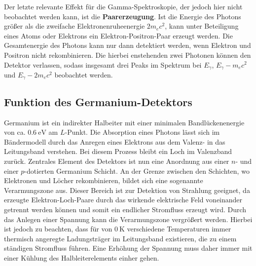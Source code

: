 Der letzte relevante Effekt für die Gamma-Spektroskopie, der jedoch hier nicht beobachtet werden kann, ist die
\textbf{Paarerzeugung}. Ist die Energie des Photons größer als die zweifache Elektronenruheenergie $2m_ec^2$,
kann unter Beteiligung eines Atoms oder Elektrons ein Elektron-Positron-Paar erzeugt werden. Die Gesamtenergie
des Photons kann nur dann detektiert werden, wenn Elektron und Positron nicht rekombinieren. Die hierbei enstehenden
zwei Photonen können den Detektor verlassen, sodass insgesamt drei Peaks im Spektrum bei $E_\gamma$, $E_\gamma - m_ec^2$ und
$E_\gamma - 2m_ec^2$ beobachtet werden.

\subsection{Funktion des Germanium-Detektors}
Germanium ist ein indirekter Halbeiter mit einer minimalen Bandlückenenergie von ca. $\SI{0.6}{\electronvolt}$ am $L$-Punkt.
Die Absorption eines Photons lässt sich im Bändermodell durch das Anregen eines Elektrons aus dem Valenz- in das
Leitungsband verstehen. Bei diesem Prozess bleibt ein Loch im Valenzband zurück. Zentrales Element des Detektors ist nun
eine Anordnung aus einer $n$- und einer $p$-dotierten Germanium Schicht. An der Grenze zwischen den Schichten, wo Elektronen
und Löcher rekombinieren, bildet sich eine sogenannte Verarmungszone aus. Dieser Bereich ist zur Detektion von Strahlung
geeignet, da erzeugte Elektron-Loch-Paare durch das wirkende elektrische Feld voneinander getrennt werden können und somit ein
endlicher Stromfluss erzeugt wird. Durch das Anlegen einer Spannung kann die Verarmungszone vergrößert werden. Hierbei ist jedoch
zu beachten, dass für von $\SI{0}{\kelvin}$ verschiedene Temperaturen immer thermisch angeregte Ladungsträger im Leitungsband existieren, die
zu einem ständigen Stromfluss führen. Eine Erhöhung der Spannung muss daher immer mit einer Kühlung des
Halbleiterelements einher gehen.

